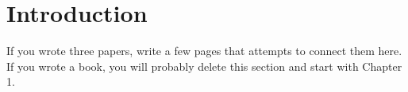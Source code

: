\chapter*{Introduction}

If you wrote three papers, write a few pages that attempts to connect them here. If you wrote a book, you will probably delete this section and start with Chapter 1.

\lipsum[1-4]
	
	
	